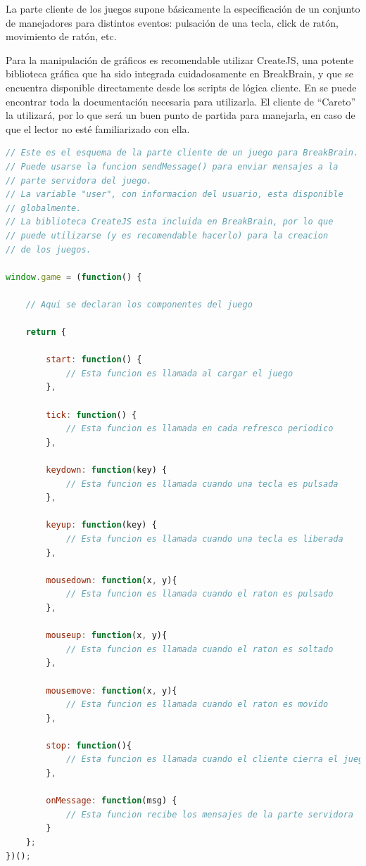 La parte cliente de los juegos supone básicamente la especificación de un conjunto de manejadores para distintos eventos: pulsación de una tecla, click de ratón, movimiento de ratón, etc.

Para la manipulación de gráficos es recomendable utilizar CreateJS, una potente biblioteca gráfica que ha sido integrada cuidadosamente en BreakBrain, y que se encuentra disponible directamente desde los scripts de lógica cliente. En \cite{CreateJS} se puede encontrar toda la documentación necesaria para utilizarla. El cliente de ``Careto'' la utilizará, por lo que será un buen punto de partida para manejarla, en caso de que el lector no esté familiarizado con ella.

\vspace{1cm}
\begin{lstlisting}[frame=single, language=JavaScript, caption={Esquema de la parte cliente de un juego para BreakBrain}, label=code::game-client-scheme]
// Este es el esquema de la parte cliente de un juego para BreakBrain.
// Puede usarse la funcion sendMessage() para enviar mensajes a la
// parte servidora del juego.
// La variable "user", con informacion del usuario, esta disponible
// globalmente.
// La biblioteca CreateJS esta incluida en BreakBrain, por lo que
// puede utilizarse (y es recomendable hacerlo) para la creacion
// de los juegos.

window.game = (function() {

    // Aqui se declaran los componentes del juego

    return {

        start: function() {
            // Esta funcion es llamada al cargar el juego
        },

        tick: function() {
            // Esta funcion es llamada en cada refresco periodico
        },

        keydown: function(key) {
            // Esta funcion es llamada cuando una tecla es pulsada
        },

        keyup: function(key) {
            // Esta funcion es llamada cuando una tecla es liberada
        },

        mousedown: function(x, y){
            // Esta funcion es llamada cuando el raton es pulsado
        },

        mouseup: function(x, y){
            // Esta funcion es llamada cuando el raton es soltado
        },

        mousemove: function(x, y){
            // Esta funcion es llamada cuando el raton es movido
        },

        stop: function(){
            // Esta funcion es llamada cuando el cliente cierra el juego
        },

        onMessage: function(msg) {
            // Esta funcion recibe los mensajes de la parte servidora
        }
    };
})();
\end{lstlisting}

